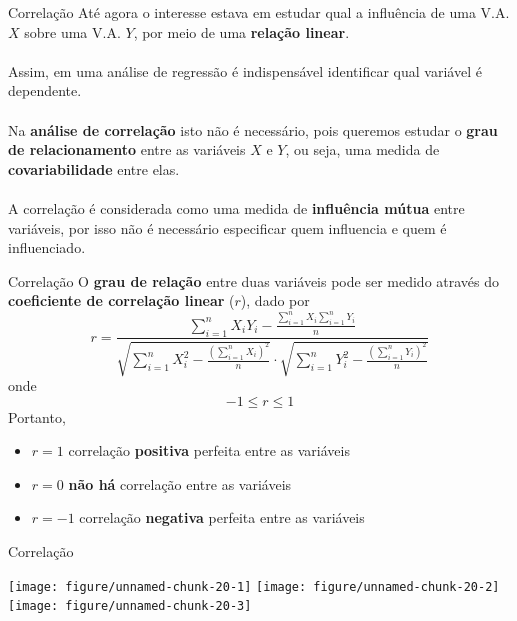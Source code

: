 \documentclass[10pt]{beamer}\usepackage[]{graphicx}\usepackage[]{color}
\newenvironment{knitrout}{}{} %
\theoremstyle{definition}
\begin{document}
\begin{frame}[fragile]{Correlação}
  Até agora o interesse estava em estudar qual a influência de uma
  V.A. $X$ sobre uma V.A. $Y$, por meio de uma \textbf{relação linear}. \\~\\
  Assim, em uma análise de regressão é indispensável identificar qual
  variável é dependente. \\~\\
  Na \textbf{análise de correlação} isto não é necessário, pois queremos
  estudar o \textbf{grau de relacionamento} entre as variáveis $X$ e
  $Y$, ou seja, uma medida de \textbf{covariabilidade} entre elas. \\~\\
  A correlação é considerada como uma medida de \textbf{influência
    mútua} entre variáveis, por isso não é necessário especificar quem
  influencia e quem é influenciado.
\end{frame}

\begin{frame}[fragile]{Correlação}
  O \textbf{grau de relação} entre duas variáveis pode ser medido
  através do \textbf{coeficiente de correlação linear} ($r$), dado por
  \begin{equation*}
    r = \frac{\sum_{i=1}^{n} X_iY_i - \frac{\sum_{i=1}^{n}
        X_i \sum_{i=1}^{n} Y_i}{n}}{\sqrt{\sum_{i=1}^{n}X_i^2 -
      \frac{(\sum_{i=1}^{n} X_i)^2}{n}} \cdot \sqrt{\sum_{i=1}^{n}Y_i^2 -
      \frac{(\sum_{i=1}^{n} Y_i)^2}{n}}}
  \end{equation*}
  onde
  \begin{equation*}
    -1 \leq r \leq 1
  \end{equation*}
  Portanto,
  \begin{itemize}
  \item $r=1$ correlação \textbf{positiva} perfeita entre as variáveis
  \item $r=0$ \textbf{não há} correlação entre as variáveis
  \item $r= -1$ correlação \textbf{negativa} perfeita entre as variáveis
  \end{itemize}
\end{frame}

\begin{frame}[fragile]{Correlação}
\begin{knitrout}\small
{}\color{fgcolor}

{\centering \texttt{[image: figure/unnamed-chunk-20-1]} 
\texttt{[image: figure/unnamed-chunk-20-2]} 
\texttt{[image: figure/unnamed-chunk-20-3]} 

}



\end{knitrout}
\end{frame}
\end{document}
